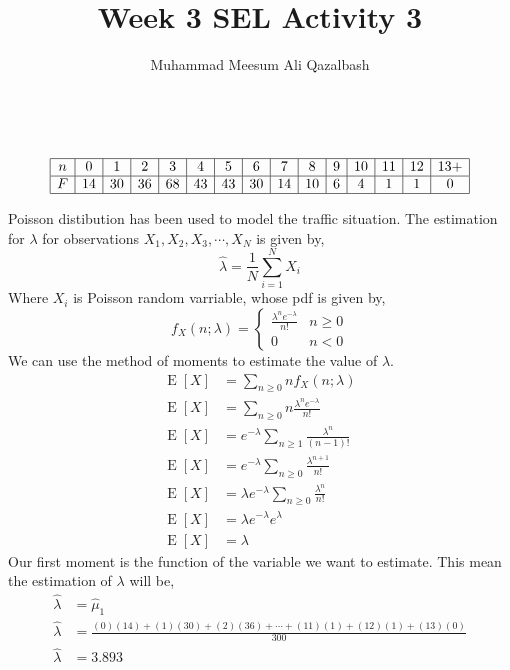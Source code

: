 \documentclass{article}
\title{Week 3 SEL Activity 3}
\author{Muhammad Meesum Ali Qazalbash}
\theoremstyle{mytheoremstyle}
\theoremstyle{mytheoremstyle}
\theoremstyle{myproblemstyle}
\begin{document}
\maketitle\
\begin{equation*}
    \begin{array}{|c|c|c|c|c|c|c|c|c|c|c|c|c|c|c|}
        \hline
        n & 0  & 1  & 2  & 3  & 4  & 5  & 6  & 7  & 8  & 9 & 10 & 11 & 12 & 13+ \\\hline
        F & 14 & 30 & 36 & 68 & 43 & 43 & 30 & 14 & 10 & 6 & 4  & 1  & 1  & 0   \\\hline
    \end{array}
\end{equation*}

Poisson distibution has been used to model the traffic situation. The estimation for \(\lambda\) for observations \(X_1,X_2,X_3,\cdots,X_N\) is given by,
\[\hat{\lambda}=\frac{1}{N}\sum_{i=1}^{N}X_{i}\]
Where \(X_i\) is Poisson random varriable, whose pdf is given by,
\[f_X(n;\lambda)=\begin{cases}
        \displaystyle\frac{\lambda^n e^{-\lambda}}{n!} & n\geq 0 \\
        0                                              & n<0
    \end{cases}\]
We can use the method of moments to estimate the value of \(\lambda\).
\begin{equation*}
    \begin{split}
        \operatorname{E}[X]&=\sum_{n\ge 0}nf_X(n;\lambda)\\
        \operatorname{E}[X]&=\sum_{n\ge 0}n\frac{\lambda^n e^{-\lambda}}{n!}\\
        \operatorname{E}[X]&=e^{-\lambda}\sum_{n\ge 1}\frac{\lambda^n}{(n-1)!}\\
        \operatorname{E}[X]&=e^{-\lambda}\sum_{n\ge 0}\frac{\lambda^{n+1}}{n!}\\
        \operatorname{E}[X]&=\lambda e^{-\lambda}\sum_{n\ge 0}\frac{\lambda^n}{n!}\\
        \operatorname{E}[X]&=\lambda e^{-\lambda}e^{\lambda}\\
        \operatorname{E}[X]&=\lambda
    \end{split}
\end{equation*}
Our first moment is the function of the variable we want to estimate. This mean the estimation of \(\lambda\) will be,
\begin{equation*}
    \begin{split}
        \hat{\lambda}&=\hat{\mu}_1\\
        \hat{\lambda}&=\frac{
            (0)(14)
            +(1)(30)
            +(2)(36)
            +\cdots
            +(11)(1)
            +(12)(1)
            +(13)(0)
        }{300}\\
        \hat{\lambda}&=3.893
    \end{split}
\end{equation*}
\end{document}
